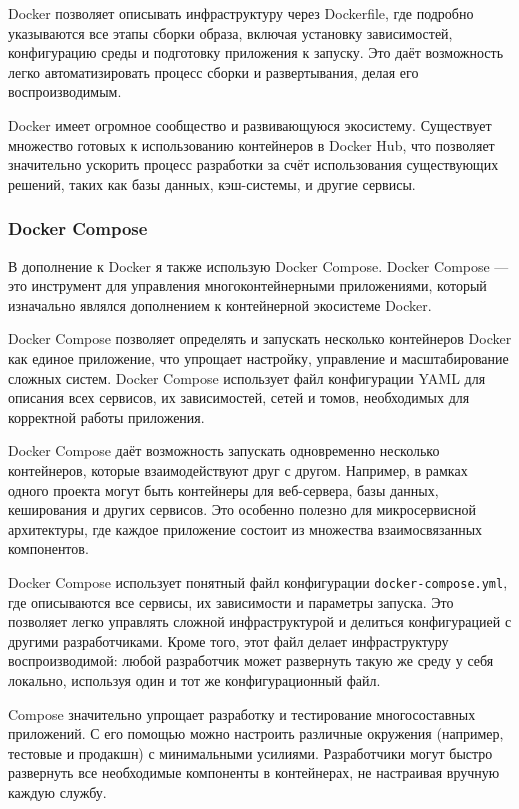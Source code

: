 \documentclass[diploma]{SCWorks}
\begin{document}
Docker позволяет описывать инфраструктуру через Dockerfile, где подробно 
указываются все этапы сборки образа, включая установку зависимостей, 
конфигурацию среды и подготовку приложения к запуску. Это даёт возможность 
легко автоматизировать процесс сборки и развертывания, делая его 
воспроизводимым.
    
Docker имеет огромное сообщество и развивающуюся экосистему. Существует 
множество готовых к использованию контейнеров в Docker Hub, что позволяет 
значительно ускорить процесс разработки за счёт использования существующих 
решений, таких как базы данных, кэш-системы, и другие сервисы.

\subsubsection{Docker Compose}

В дополнение к Docker я также использую Docker Compose. Docker Compose — это 
инструмент для управления многоконтейнерными приложениями, который изначально
являлся дополнением к контейнерной экосистеме Docker.

Docker Compose позволяет определять и запускать несколько контейнеров Docker 
как единое приложение, что упрощает настройку, управление и масштабирование 
сложных систем. Docker Compose использует файл конфигурации YAML для описания 
всех сервисов, их зависимостей, сетей и томов, необходимых для корректной 
работы приложения.

Docker Compose даёт возможность запускать одновременно несколько контейнеров, 
которые взаимодействуют друг с другом. Например, в рамках одного проекта могут 
быть контейнеры для веб-сервера, базы данных, кеширования и других сервисов. 
Это особенно полезно для микросервисной архитектуры, где каждое приложение 
состоит из множества взаимосвязанных компонентов.
    
Docker Compose использует понятный файл конфигурации 
\texttt{docker-compose.yml}, где описываются все сервисы, их зависимости и 
параметры запуска. Это позволяет легко управлять сложной инфраструктурой и 
делиться конфигурацией с другими разработчиками. Кроме того, этот файл делает 
инфраструктуру воспроизводимой: любой разработчик может развернуть такую же 
среду у себя локально, используя один и тот же конфигурационный файл.
    
Compose значительно упрощает разработку и тестирование многосоставных 
приложений. С его помощью можно настроить различные окружения (например, 
тестовые и продакшн) с минимальными усилиями. Разработчики могут быстро 
развернуть все необходимые компоненты в контейнерах, не настраивая вручную 
каждую службу.
    
\end{document}
